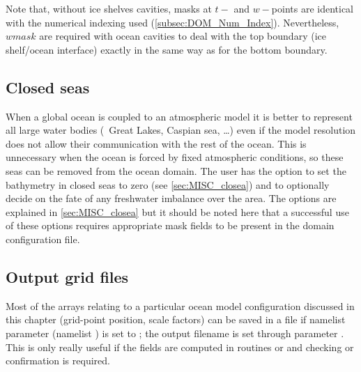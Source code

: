 \documentclass[../main/NEMO_manual]{subfiles}
\begin{document}
Note that, without ice shelves cavities,
masks at $t-$ and $w-$points are identical with the numerical indexing used
(\autoref{subsec:DOM_Num_Index}).
Nevertheless,
$wmask$ are required with ocean cavities to deal with the top boundary (ice shelf/ocean interface)
exactly in the same way as for the bottom boundary.


\subsection{Closed seas}
\label{subsec:DOM_closea}

When a global ocean is coupled to an atmospheric model it is better to
represent all large water bodies (\eg\ Great Lakes, Caspian sea, \dots) even if
the model resolution does not allow their communication with the rest of the ocean.
This is unnecessary when the ocean is forced by fixed atmospheric conditions,
so these seas can be removed from the ocean domain.
The user has the option to
set the bathymetry in closed seas to zero (see \autoref{sec:MISC_closea}) and to
optionally decide on the fate of any freshwater imbalance over the area.
The options are explained in \autoref{sec:MISC_closea} but
it should be noted here that a successful use of these options requires
appropriate mask fields to be present in the domain configuration file.

\subsection{Output grid files}
\label{subsec:DOM_meshmask}

Most of the arrays relating to a particular ocean model configuration discussed in this chapter
(grid-point position, scale factors) can be saved in a file if
namelist parameter  (namelist ) is set to
;
the output filename is set through parameter .
This is only really useful if
the fields are computed in routines  or  and
checking or confirmation is required.
\end{document}
